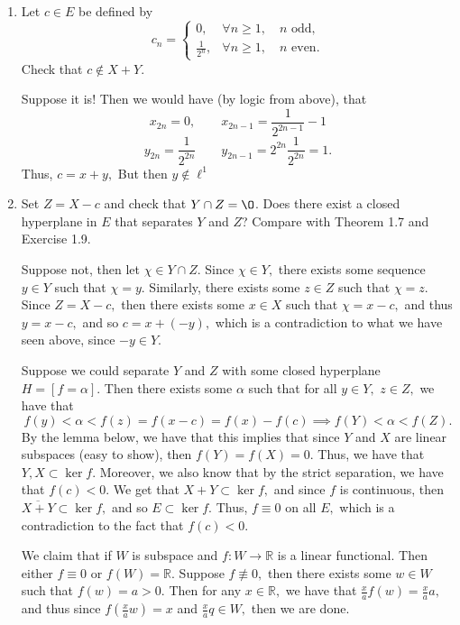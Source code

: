 \documentclass[11pt]{article}
\newcommand{\bbR}{\mathbb{R}}
\renewcommand{\emptyset}{\O}
\begin{document}
\begin{problem}
\begin{enumerate}
\begin{problem}
\begin{enumerate}
\begin{solution}
\end{solution}
    \item Let $c \in E$ be defined by
    \[
    c_n =
    \begin{cases}
        0, & \forall n \geq 1, \quad n \text{ odd}, \\
        \frac{1}{2^n}, & \forall n \geq 1, \quad n \text{ even}.
    \end{cases}
    \]
    Check that $c \notin X + Y$.
    \begin{solution}
        Suppose it is! Then we would have (by logic from above), that 
        \[x_{2n}= 0, \qquad x_{2n-1} = \frac{1}{2^{2n-1}} 
 - 1\]
        \[y_{2n} = \frac{1}{2^{2n}} \qquad y_{2n-1} = 2^{2n}\frac{1}{2^{2n}} = 1.\]
        Thus, $c = x+y,$ But then $y\notin \ell^1$
    \end{solution}
    \item Set $Z = X - c$ and check that $Y \cap Z = \emptyset$. Does there exist a closed hyperplane in $E$ that separates $Y$ and $Z$? Compare with Theorem 1.7 and Exercise 1.9.
    \begin{solution}
    Suppose not, then let $\chi \in Y \cap Z.$ Since $\chi \in Y,$ there exists some sequence $y\in Y$ such that $\chi = y.$ Similarly, there exists some $z\in Z$ such that $\chi = z.$ Since $Z = X - c,$ then there exists some $x\in X$ such that $\chi = x-c,$ and thus $y = x-c,$ and so $c = x + (-y),$ which is a contradiction to what we have seen above, since $-y \in Y.$ 

    Suppose we could separate $Y$ and $Z$ with some closed hyperplane $H = [f = \alpha].$ Then there exists some $\alpha$ such that for all $y \in Y,$ $z\in Z,$ we have that 
    \[f(y) < \alpha < f(z) = f(x-c) = f(x) - f(c) \implies f(Y) < \alpha < f(Z).\] By the lemma below, we have that this implies that since $Y$ and $X$ are linear subspaces (easy to show), then $f(Y) = f(X) = 0.$  Thus, we have that $Y, X \subset \ker f.$ Moreover, we also know that by the strict separation, we have that $f(c) <0.$ We get that $X + Y \subset \ker f,$ and since $f$ is continuous, then $\overline{ X + Y}\subset \ker f,$ and so $E \subset \ker f.$ Thus, $f \equiv 0$ on all $E,$ which is a contradiction to the fact that $f(c) < 0.$
    \end{solution}
    \begin{reflection}
        We claim that if $W$ is subspace and $f: W\to \bbR$ is a linear functional. Then either $f \equiv 0$ or $f(W) = \bbR.$ Suppose $f\not \equiv 0,$ then there exists some $w\in W$ such that $f(w) = a >0.$ Then for any $x\in \bbR,$ we have that  $\frac{x}{a}f(w) = \frac{x}{a} a,$ and thus since $f(\frac{x}{a}w)= x$ and $\frac{x}{a}q\in W,$ then we are done. 
    \end{reflection}
\end{enumerate}
\end{problem}




\end{enumerate}
\end{problem}
\end{document}
